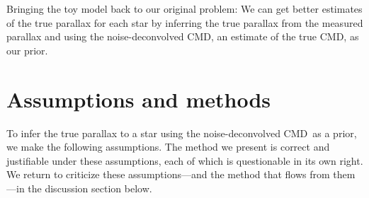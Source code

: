 \documentclass[modern]{aastex61}
\newcommand{\acronym}[1]{{\small{#1}}}
\newcommand{\cmd}{\acronym{CMD}}
\begin{document}
Bringing the toy model back to our original problem:
We can get better estimates of the true parallax for each star by inferring the true parallax from the measured parallax and using the noise-deconvolved \cmd, an estimate of the true \cmd, as our prior.

\section{Assumptions and methods}\label{sec:method}

To infer the true parallax to a star using the noise-deconvolved \cmd\ as
a prior, we make the following assumptions. The method we present is correct
and justifiable under these assumptions, each of which is questionable
in its own right. We return to criticize these assumptions---and the
method that flows from them---in the discussion section below.
\end{document}
